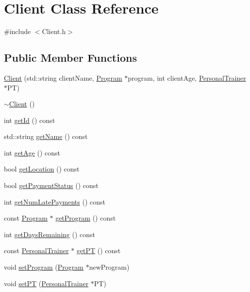 \hypertarget{classClient}{}\section{Client Class Reference}
\label{classClient}


{\ttfamily \#include $<$Client.\+h$>$}

\subsection*{Public Member Functions}
\begin{DoxyCompactItemize}
\item 
\hyperlink{classClient_a4624a4770956657d197cb291aaf22159}{Client} (std\+::string client\+Name, \hyperlink{classProgram}{Program} $\ast$program, int client\+Age, \hyperlink{classPersonalTrainer}{Personal\+Trainer} $\ast$PT)
\item 
\hyperlink{classClient_a840e519ca781888cbd54181572ebe3a7}{$\sim$\+Client} ()
\item 
int \hyperlink{classClient_aa7a18574ee05278b0b09c93d3dcaa17f}{get\+Id} () const 
\item 
std\+::string \hyperlink{classClient_a28a677584ad4793b50b31c2e75039e2c}{get\+Name} () const 
\item 
int \hyperlink{classClient_a7c8a6eebab96ddf6dc7578ab6b823430}{get\+Age} () const 
\item 
bool \hyperlink{classClient_a3e74dcfb504ae74f36c10cc1acc1f9aa}{get\+Location} () const 
\item 
bool \hyperlink{classClient_af0ea565866db60311a27bc8e14ed626c}{get\+Payment\+Status} () const 
\item 
int \hyperlink{classClient_afcd9150adffb6e3dc61b31a78cf424b2}{get\+Num\+Late\+Payments} () const 
\item 
const \hyperlink{classProgram}{Program} $\ast$ \hyperlink{classClient_aac61a1ce19ef1689c8003f19a746134d}{get\+Program} () const 
\item 
int \hyperlink{classClient_a887d741f1de7907f2fa82f608770daed}{get\+Days\+Remaining} () const 
\item 
const \hyperlink{classPersonalTrainer}{Personal\+Trainer} $\ast$ \hyperlink{classClient_ac5a64ea1c1b31db70d432bbfa44b1d0d}{get\+PT} () const 
\item 
void \hyperlink{classClient_aa04435ec00bb2dea4e5f083910e8a399}{set\+Program} (\hyperlink{classProgram}{Program} $\ast$new\+Program)
\item 
void \hyperlink{classClient_a4545f9a6968a2ca02f2ba27dba240660}{set\+PT} (\hyperlink{classPersonalTrainer}{Personal\+Trainer} $\ast$PT)

\end{DoxyCompactItemize}
